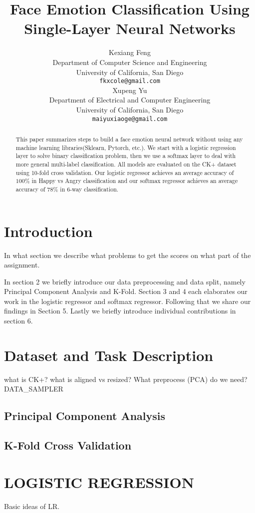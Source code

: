 \documentclass{article} %
\title{Face Emotion Classification Using Single-Layer Neural Networks}
\author{
Kexiang Feng \\
Department of Computer Science and Engineering\\
University of California, San Diego\\
\texttt{fkxcole@gmail.com} \\
\And
Xupeng Yu \\
Department of Electrical and Computer Engineering \\
University of California, San Diego \\
\texttt{maiyuxiaoge@gmail.com}
}
\begin{document}
\maketitle

\begin{abstract}
This paper summarizes steps to build a face emotion neural network without using any machine learning libraries(Sklearn, Pytorch, etc.). We start with a logistic regression layer to solve binary classification problem, then we use a softmax layer to deal with more general multi-label classification. All models are evaluated on the CK+ dataset using 10-fold cross validation. Our logistic regressor achieves an average accuracy of $ 100\% $ in Happy vs Angry classification and our softmax regressor achieves an average accuracy of 78\% in 6-way classification.
\end{abstract}

\section{Introduction}
In what section we describe what problems to get the scores on what part of the assignment.

In section 2 we briefly introduce our data preprocessing and data split, namely Principal Component Analysis and K-Fold. Section 3 and 4 each elaborates our work in the logistic regressor and softmax regressor. Following that we share our findings in Section 5. Lastly we briefly introduce individual contributions in section 6.

\section{Dataset and Task Description}

what is CK+? what is aligned vs resized? What preprocess (PCA) do we need?
DATA\_SAMPLER

\subsection {Principal Component Analysis}
\subsection {K-Fold Cross Validation}


\section{LOGISTIC REGRESSION}
Basic ideas of LR. 
\end{document}

